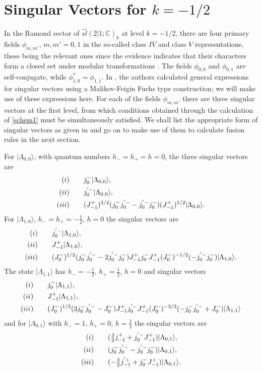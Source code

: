 \documentclass[a4paper,12pt]{article}
\def\hslck       {\hat{sl}(2|1;{\mathbb C})_k}
\def\hf          {\tfrac{1}{2}}
\def\thf         {\tfrac{3}{2}}
\begin{document}
\section{Singular Vectors for $k=-1/2$}

In the Ramond sector of $\hslck$ at level $k=-1/2$, there are four
primary fields $\phi_{m,m'}$, $m,m'=0,1$ in the
so-called class $IV$ and class $V$ representations, these being the
relevant ones since the evidence indicates that their characters form
a closed set under modular transformations \cite{GBJ}.  The fields 
$\phi_{0,0}$ and $\phi_{0,1}$ are self-conjugate, while 
$\phi^*_{1,0}=\phi_{1,1}$.  In
\cite{BT97}, the authors calculated general expressions for singular
vectors using a Malikov-Feigin Fuchs type construction; we will make use of
these expressions here.  For each of the fields $\phi_{m,m'}$ there are three
singular vectors at the first level, from which conditions obtained through
the calculation of \eqref{schem1} must be simultaneously satisfied.  We shall
list the appropriate form of singular vectors as given in \cite{BT97} and go
on to make use of them to calculate fusion rules in the next section. 

For $|\Lambda_{0,0}\rangle$, with quantum numbers $h_-=h_+=h=0$, the three singular vectors
are 
\begin{align}
\label{la00}
(i)\qquad& j_0^-|\Lambda_{0,0}\rangle,\notag\\
(ii) \qquad& j_0^{'-}|\Lambda_{0,0}\rangle,\notag\\
(iii) \qquad& 
(J_{-1}^+)^{3/2}(j_0^-j_0^{'-}-j_0^{'-}j_0^-)
(J_{-1}^+)^{1/2}|\Lambda_{0,0}\rangle.  
\end{align}
For $|\Lambda_{1,0}\rangle$, $h_-=h_+=-\hf$, $h=0$ the singular vectors are
\begin{align}
\label{la10}
(i)\qquad& j_0^{'-}|\Lambda_{1,0}\rangle,\notag\\
(ii) \qquad& J_{-1}^+|\Lambda_{1,0}\rangle,\notag\\
(iii) \qquad& 
(J_0^-)^{1/2}(j_0^-j_0^{'-}-2j_0^{'-}j_0^-)J_{-1}^+j_0^-J_{-1}^+(J_0^-)^{-1/2}(-j_0^{'-}j_0^-)|\Lambda_{1,0}\rangle.
\end{align}
The state $|\Lambda_{1,1}\rangle$ has $h_-=-\hf$, $h_+=\hf$, $h=0$ and singular vectors
\begin{align}
\label{la11}
(i)\qquad& j_0^-|\Lambda_{1,1}\rangle,\notag\\
(ii) \qquad& J_{-1}^+|\Lambda_{1,1}\rangle,\notag\\
(iii) \qquad&
(J_0^-)^{1/2}(3j_0^-j_0^{'-} -J_0^-)
J_{-1}^+
j_0^{'-}J_{-1}^+(J_0^-)^{-3/2}(-j_0^-j_0^{'-}+J_0^-)|\Lambda_{1,1}\rangle 
\end{align}
and for $|\Lambda_{0,1}\rangle$ with $h_-=1$, $h_+=0$, $h=\hf$ the singular vectors are
\begin{align}
\label{la01}
(i)\qquad& (\thf j_{-1}^+ + j_0^{'-}J_{-1}^+)|\Lambda_{0,1}\rangle,\notag\\
(ii) \qquad& 
(j_0^-j_0^{'-}-j_0^{'-}j_0^-)|\Lambda_{0,1}\rangle,\notag\\
(iii) \qquad& 
(-\thf j_{-1}^{'+} + j_0^-J_{-1}^+)|\Lambda_{0,1}\rangle.
\end{align}
\end{document}

